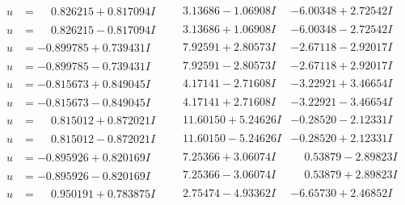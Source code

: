 \documentclass[1p]{elsarticle_modified}
\theoremstyle{definition}
\begin{document}
$$\begin{array}{c|c|c}
\begin{aligned}
u &= \phantom{-}0.826215 + 0.817094 I\end{aligned}
 & \phantom{-}3.13686 - 1.06908 I & -6.00348 + 2.72542 I \\ \hline\begin{aligned}
u &= \phantom{-}0.826215 - 0.817094 I\end{aligned}
 & \phantom{-}3.13686 + 1.06908 I & -6.00348 - 2.72542 I \\ \hline\begin{aligned}
u &= -0.899785 + 0.739431 I\end{aligned}
 & \phantom{-}7.92591 + 2.80573 I & -2.67118 - 2.92017 I \\ \hline\begin{aligned}
u &= -0.899785 - 0.739431 I\end{aligned}
 & \phantom{-}7.92591 - 2.80573 I & -2.67118 + 2.92017 I \\ \hline\begin{aligned}
u &= -0.815673 + 0.849045 I\end{aligned}
 & \phantom{-}4.17141 - 2.71608 I & -3.22921 + 3.46654 I \\ \hline\begin{aligned}
u &= -0.815673 - 0.849045 I\end{aligned}
 & \phantom{-}4.17141 + 2.71608 I & -3.22921 - 3.46654 I \\ \hline\begin{aligned}
u &= \phantom{-}0.815012 + 0.872021 I\end{aligned}
 & \phantom{-}11.60150 + 5.24626 I & -0.28520 - 2.12331 I \\ \hline\begin{aligned}
u &= \phantom{-}0.815012 - 0.872021 I\end{aligned}
 & \phantom{-}11.60150 - 5.24626 I & -0.28520 + 2.12331 I \\ \hline\begin{aligned}
u &= -0.895926 + 0.820169 I\end{aligned}
 & \phantom{-}7.25366 + 3.06074 I & \phantom{-}0.53879 - 2.89823 I \\ \hline\begin{aligned}
u &= -0.895926 - 0.820169 I\end{aligned}
 & \phantom{-}7.25366 - 3.06074 I & \phantom{-}0.53879 + 2.89823 I \\ \hline\begin{aligned}
u &= \phantom{-}0.950191 + 0.783875 I\end{aligned}
 & \phantom{-}2.75474 - 4.93362 I & -6.65730 + 2.46852 I \\ \hline\begin{aligned}

\end{aligned}
\end{array}$$
\end{document}
